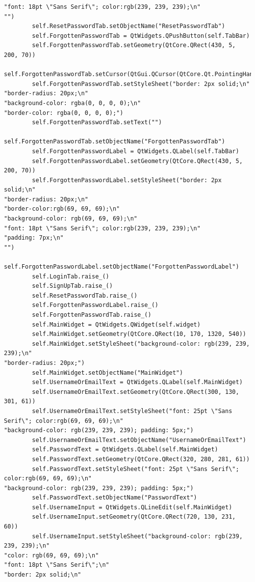 \documentclass[12pt]{article}
\begin{document}
\begin{lstlisting}
"font: 18pt \"Sans Serif\"; color:rgb(239, 239, 239);\n"
"")
        self.ResetPasswordTab.setObjectName("ResetPasswordTab")
        self.ForgottenPasswordTab = QtWidgets.QPushButton(self.TabBar)
        self.ForgottenPasswordTab.setGeometry(QtCore.QRect(430, 5, 200, 70))
        self.ForgottenPasswordTab.setCursor(QtGui.QCursor(QtCore.Qt.PointingHandCursor))
        self.ForgottenPasswordTab.setStyleSheet("border: 2px solid;\n"
"border-radius: 20px;\n"
"background-color: rgba(0, 0, 0, 0);\n"
"border-color: rgba(0, 0, 0, 0);")
        self.ForgottenPasswordTab.setText("")
        self.ForgottenPasswordTab.setObjectName("ForgottenPasswordTab")
        self.ForgottenPasswordLabel = QtWidgets.QLabel(self.TabBar)
        self.ForgottenPasswordLabel.setGeometry(QtCore.QRect(430, 5, 200, 70))
        self.ForgottenPasswordLabel.setStyleSheet("border: 2px solid;\n"
"border-radius: 20px;\n"
"border-color:rgb(69, 69, 69);\n"
"background-color: rgb(69, 69, 69);\n"
"font: 18pt \"Sans Serif\"; color:rgb(239, 239, 239);\n"
"padding: 7px;\n"
"")
        self.ForgottenPasswordLabel.setObjectName("ForgottenPasswordLabel")
        self.LoginTab.raise_()
        self.SignUpTab.raise_()
        self.ResetPasswordTab.raise_()
        self.ForgottenPasswordLabel.raise_()
        self.ForgottenPasswordTab.raise_()
        self.MainWidget = QtWidgets.QWidget(self.widget)
        self.MainWidget.setGeometry(QtCore.QRect(10, 170, 1320, 540))
        self.MainWidget.setStyleSheet("background-color: rgb(239, 239, 239);\n"
"border-radius: 20px;")
        self.MainWidget.setObjectName("MainWidget")
        self.UsernameOrEmailText = QtWidgets.QLabel(self.MainWidget)
        self.UsernameOrEmailText.setGeometry(QtCore.QRect(300, 130, 301, 61))
        self.UsernameOrEmailText.setStyleSheet("font: 25pt \"Sans Serif\"; color:rgb(69, 69, 69);\n"
"background-color: rgb(239, 239, 239); padding: 5px;")
        self.UsernameOrEmailText.setObjectName("UsernameOrEmailText")
        self.PasswordText = QtWidgets.QLabel(self.MainWidget)
        self.PasswordText.setGeometry(QtCore.QRect(320, 280, 281, 61))
        self.PasswordText.setStyleSheet("font: 25pt \"Sans Serif\"; color:rgb(69, 69, 69);\n"
"background-color: rgb(239, 239, 239); padding: 5px;")
        self.PasswordText.setObjectName("PasswordText")
        self.UsernameInput = QtWidgets.QLineEdit(self.MainWidget)
        self.UsernameInput.setGeometry(QtCore.QRect(720, 130, 231, 60))
        self.UsernameInput.setStyleSheet("background-color: rgb(239, 239, 239);\n"
"color: rgb(69, 69, 69);\n"
"font: 18pt \"Sans Serif\";\n"
"border: 2px solid;\n"

\end{lstlisting}
\end{document}
